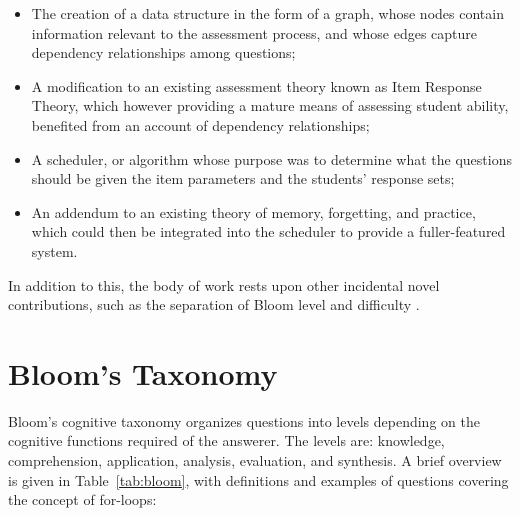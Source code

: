 \begin{itemize}

 \item The creation of a data structure in the form of a graph, whose nodes
 contain information relevant to the assessment process, and whose edges
 capture dependency relationships among questions;

 \item A modification to an existing assessment theory known as Item Response
 Theory, which however providing a mature means of assessing student ability,
 benefited from an account of dependency relationships;
 
 \item A scheduler, or algorithm whose purpose was to determine what the
 questions should be given the item parameters and the students' response
 sets;

 \item An addendum to an existing theory of memory, forgetting, and practice,
 which could then be integrated into the scheduler to provide a fuller-featured
 system.

\end{itemize}

In addition to this, the body of work rests upon other incidental novel
contributions, such as the separation of Bloom level and difficulty
\cite{castleberry}.

\section{Bloom's Taxonomy}

Bloom's cognitive taxonomy organizes questions into levels depending on the
cognitive functions required of the answerer.  The levels are: knowledge,
comprehension, application, analysis, evaluation, and synthesis.  A brief
overview is given in Table~\ref{tab:bloom}, with definitions and examples of
questions covering the concept of for-loops:

